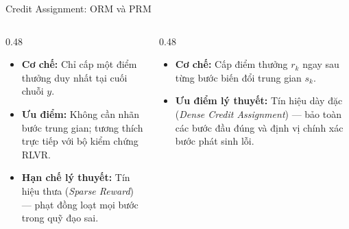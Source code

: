 \begin{frame}{Credit Assignment: ORM và PRM}
  \vspace{0.05cm}
  \begin{columns}[T,onlytextwidth]
    \begin{column}{0.48\textwidth}
      \small
      \begin{itemize}\setlength{\itemsep}{4pt}
        \item \textbf{Cơ chế:} Chỉ cấp một điểm thưởng duy nhất tại cuối chuỗi $y$.
        \item \textbf{Ưu điểm:} Không cần nhãn bước trung gian; tương thích trực tiếp với bộ kiểm chứng RLVR.
        \item \textbf{Hạn chế lý thuyết:} Tín hiệu thưa (\textit{Sparse Reward}) --- phạt đồng loạt mọi bước trong quỹ đạo sai.
      \end{itemize}
    \end{column}
    \begin{column}{0.48\textwidth}
      \small
      \begin{itemize}\setlength{\itemsep}{4pt}
        \item \textbf{Cơ chế:} Cấp điểm thưởng $r_k$ ngay sau từng bước biến đổi trung gian $s_k$.
        \item \textbf{Ưu điểm lý thuyết:} Tín hiệu dày đặc (\textit{Dense Credit Assignment}) --- bảo toàn các bước đầu đúng và định vị chính xác bước phát sinh lỗi.
      \end{itemize}
    \end{column}
  \end{columns}
  \par\vspace{0pt}
\end{frame}

